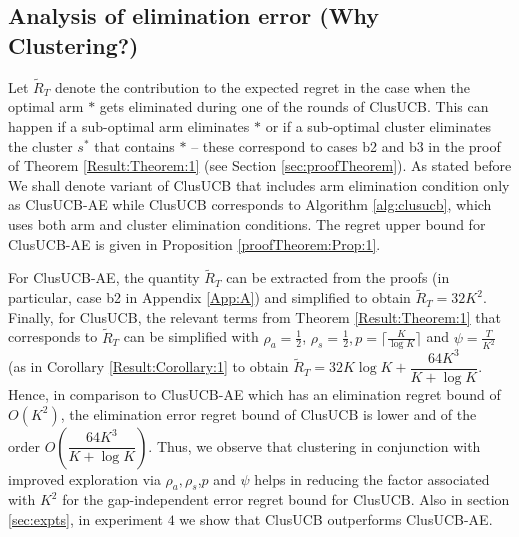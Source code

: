 

\subsection*{Analysis of elimination error (Why Clustering?)}
Let $\widetilde R_T$ denote the contribution  to the expected regret in the case when the optimal arm $*$ gets eliminated during one of the rounds of ClusUCB. This can happen if a sub-optimal arm eliminates $*$ or if a sub-optimal cluster eliminates the cluster $s^*$ that contains $*$ -- these correspond to cases b2 and b3 in the proof of Theorem \ref{Result:Theorem:1} (see Section \ref{sec:proofTheorem}). 
As stated before We shall denote variant of ClusUCB that includes arm elimination condition only as ClusUCB-AE while ClusUCB corresponds to Algorithm \ref{alg:clusucb}, which uses both arm and cluster elimination conditions. The regret upper bound for ClusUCB-AE is given in Proposition \ref{proofTheorem:Prop:1}.

For ClusUCB-AE, the quantity $\widetilde R_T$ can be extracted from the proofs (in particular, case b2 in Appendix \ref{App:A}) and simplified to obtain $\widetilde R_T = 32K^2 $. Finally, for ClusUCB, the relevant terms from Theorem \ref{Result:Theorem:1} that corresponds to $\widetilde R_T$ can be simplified with $\rho_{a}=\frac{1}{2}$, $\rho_{s}=\frac{1}{2},p=\big\lceil \frac{K}{\log K} \big\rceil$ and $\psi=\frac{T}{K^2}$ (as in Corollary \ref{Result:Corollary:1} to obtain  
$\tilde R_T = 32K\log K + \dfrac{64 K^3}{K+\log K}$. Hence, in comparison to ClusUCB-AE which has an elimination regret bound of $O(K^2)$, the elimination error regret bound of ClusUCB is lower and of the order $O(\dfrac{64 K^3}{K+\log K})$. Thus, we observe that clustering in conjunction with improved exploration via $\rho_{a},\rho_{s}$,$p$ and $\psi$ helps in reducing the factor associated with $K^2$ for the gap-independent error regret bound for ClusUCB. Also in section \ref{sec:expts}, in experiment $4$ we show that ClusUCB outperforms ClusUCB-AE. 



